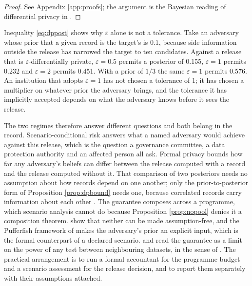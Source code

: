\documentclass[11pt,a4paper]{article}
\theoremstyle{plain}
\theoremstyle{definition}
\theoremstyle{definition}
\theoremstyle{plain}
\begin{document}
\begin{proof}
See Appendix \ref{app:proofs}; the argument is the Bayesian reading of
differential privacy in \citet{kasiviswanathan2014}.
\end{proof}

Inequality \eqref{eq:dppost} shows why $\varepsilon$ alone is not a
tolerance. Take an adversary whose prior that a given record is the target's is
$0.1$, because side information outside the release has narrowed the target to
ten candidates. Against a release that is $\varepsilon$-differentially private,
$\varepsilon = 0.5$ permits a posterior of 0.155, $\varepsilon = 1$ permits 0.232
and $\varepsilon = 2$ permits 0.451. With a prior of $1/3$ the same
$\varepsilon = 1$ permits 0.576. An institution that adopts $\varepsilon = 1$
has not chosen a tolerance of 1; it has chosen a multiplier on whatever prior
the adversary brings, and the tolerance it has implicitly accepted depends on
what the adversary knows before it sees the release.

The two regimes therefore answer different questions and both belong in the
record. Scenario-conditional risk answers what a named adversary would achieve
against this release, which is the question a governance committee, a data
protection authority and an affected person all ask. Formal privacy bounds how
far any adversary's beliefs can differ between the release computed with a
record and the release computed without it. That comparison of two posteriors
\citep{kasiviswanathan2014} needs no assumption about how records depend on one
another; only the prior-to-posterior form of Proposition \ref{prop:dpbound}
needs one, because correlated records carry information about each other
\citep{kifer2011}. The guarantee composes across a programme,
which scenario analysis cannot do because Proposition \ref{prop:nopool} denies
it a composition theorem. \citet{kifer2011} show that
neither can be made assumption-free, and the Pufferfish framework of
\citet{kifer2014} makes the adversary's prior an explicit input, which is the
formal counterpart of a declared scenario. \citet{kairouz2017} and
\citet{balle2020} read the guarantee as a limit on the power of any test between
neighbouring datasets, in the sense of \citet{neyman1933}. The practical arrangement is to run a
formal accountant for the programme budget and a scenario assessment for the
release decision, and to report them separately with their assumptions attached.
\end{document}
